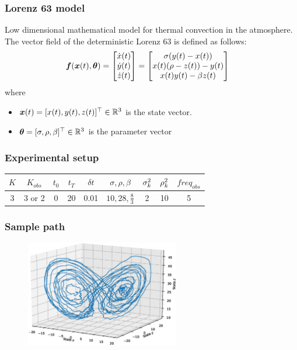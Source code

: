 \begin{frame}[t]
    \frametitle{Lorenz 63 model}
    Low dimensional mathematical model for thermal convection in the atmosphere.
    The vector field of the deterministic Lorenz 63 is defined as follows:
    \begin{align}
        \boldsymbol{f}(\boldsymbol{x}(t), \boldsymbol{\theta})
        & =
        \begin{bmatrix}
            \dot{x}(t)
            \\ 
            \dot{y}(t)
            \\
            \dot{z}(t)
        \end{bmatrix}
        =
        \begin{bmatrix}
            \sigma(y(t) - x(t))
            \\
            x(t)(\rho - z(t)) - y(t)
            \\
            x(t)y(t) - \beta z(t)
        \end{bmatrix}
        \label{eq-lorenz-63-odes}
    \end{align}
    where
    \begin{itemize}
        \item[] $\boldsymbol{x}(t) = [x(t), y(t), z(t)]^\top \in \mathbb{R}^3$ is the state vector.
        \item[] $\boldsymbol{\theta} = [\sigma, \rho, \beta]^\top \in \mathbb{R}^3$ is the parameter vector
    \end{itemize}
\end{frame}

\begin{frame}[t]
    \frametitle{Experimental setup}
    \begin{table}
    \centering
    \label{table-lorenz-63-setup}
    \begin{tabular}{|c|c|c|c|c|c|c|c|c|}
    \hline
    $K$ & $K_{obs}$ & $t_0$ & $t_T$ & $\delta t$ & $\sigma, \rho, \beta$ & $\sigma_{k}^2$  & $\rho_{k}^2$ & $freq_{obs}$ \\ \hline
    3 & 3 or 2 & 0 & 20 & 0.01 & $10, 28, \frac{8}{3}$ & 2 & 10 & 5 \\ \hline
    \end{tabular}
    \end{table}    
\end{frame}

\begin{frame}[t]
    \frametitle{Sample path}
    \begin{figure}
        \centering
        \includegraphics[width=0.6\textwidth]{graphics/lorenz-63-sample-path}
        \label{fig-lorenz-63-sample-path}
    \end{figure}    
\end{frame}

